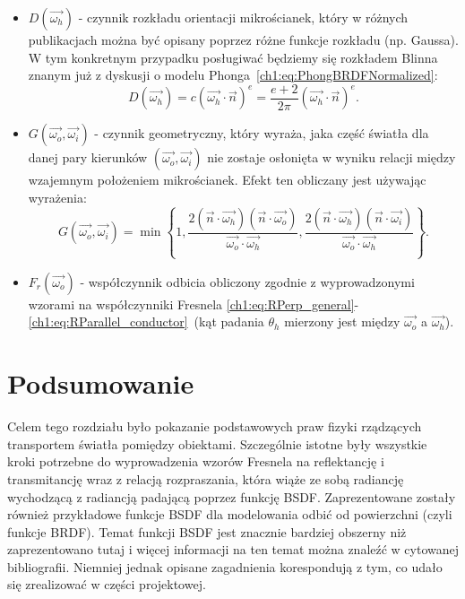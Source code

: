 \begin{itemize}
\item[] $D(\vec{\omega_h})$ - czynnik rozkładu orientacji mikrościanek, który w różnych publikacjach można być opisany poprzez różne funkcje rozkładu (np. Gaussa). W tym konkretnym przypadku posługiwać będziemy się rozkładem Blinna znanym już z dyskusji o modelu Phonga~\eqref{ch1:eq:PhongBRDFNormalized}:
\begin{equation}
\label{ch1:eq:TorranceSparrow_D}
D(\vec{\omega_h}) = c(\vec{\omega_h}\cdot\vec{n})^e = \frac{e + 2}{2\pi}(\vec{\omega_h}\cdot\vec{n})^e.
\end{equation}
\item[] $G(\vec{\omega_o}, \vec{\omega_i})$ - czynnik geometryczny, który wyraża, jaka część światła dla danej pary kierunków $(\vec{\omega_o}, \vec{\omega_i})$ nie zostaje osłonięta w wyniku relacji między wzajemnym położeniem mikrościanek. Efekt ten obliczany jest używając wyrażenia:
\begin{equation}
G(\vec{\omega_o}, \vec{\omega_i}) = \min\left\lbrace 1, \frac{2(\vec{n}\cdot\vec{\omega_h})(\vec{n}\cdot\vec{\omega_o})}{\vec{\omega_o}\cdot\vec{\omega_h}}, \frac{2(\vec{n}\cdot\vec{\omega_h})(\vec{n}\cdot\vec{\omega_i})}{\vec{\omega_o}\cdot\vec{\omega_h}} \right\rbrace.
\end{equation}
\item[] $F_r(\vec{\omega_o})$ - współczynnik odbicia obliczony zgodnie z wyprowadzonymi wzorami na współczynniki Fresnela \eqref{ch1:eq:RPerp_general}-\eqref{ch1:eq:RParallel_conductor}~(kąt padania $\theta_h$ mierzony jest między $\vec{\omega_o}$ a $\vec{\omega_h}$). 
\end{itemize}

\section*{Podsumowanie}
Celem tego rozdziału było pokazanie podstawowych praw fizyki rządzących transportem światła pomiędzy obiektami. Szczególnie istotne były wszystkie kroki potrzebne do wyprowadzenia wzorów Fresnela na reflektancję i transmitancję wraz z relacją rozpraszania, która wiąże ze sobą radiancję wychodzącą z radiancją padającą poprzez funkcję BSDF. Zaprezentowane zostały również przykładowe funkcje BSDF dla modelowania odbić od powierzchni (czyli funkcje BRDF). Temat funkcji BSDF jest znacznie bardziej obszerny niż zaprezentowano tutaj i więcej informacji na ten temat można znaleźć w cytowanej bibliografii. Niemniej jednak opisane zagadnienia korespondują z tym, co udało się zrealizować w części projektowej.

